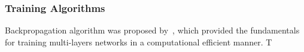 \subsubsection{Training Algorithms}
Backpropagation algorithm was proposed by~\citet{werbos1975beyond}, which provided the fundamentals for training multi-layers networks in a computational efficient manner. T